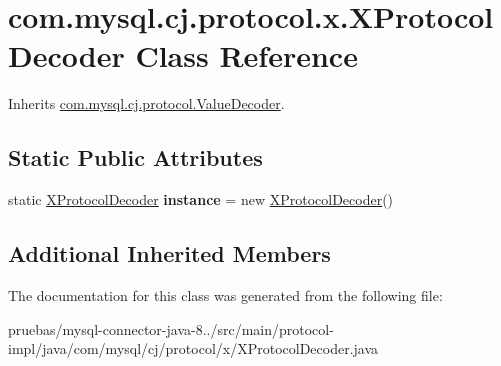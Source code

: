 \hypertarget{classcom_1_1mysql_1_1cj_1_1protocol_1_1x_1_1_x_protocol_decoder}{}\section{com.\+mysql.\+cj.\+protocol.\+x.\+X\+Protocol\+Decoder Class Reference}
\label{classcom_1_1mysql_1_1cj_1_1protocol_1_1x_1_1_x_protocol_decoder}


Inherits \mbox{\hyperlink{interfacecom_1_1mysql_1_1cj_1_1protocol_1_1_value_decoder}{com.\+mysql.\+cj.\+protocol.\+Value\+Decoder}}.

\subsection*{Static Public Attributes}
\begin{DoxyCompactItemize}
\item 
\mbox{\label{classcom_1_1mysql_1_1cj_1_1protocol_1_1x_1_1_x_protocol_decoder_a33586fad8de270f9c09836b1ebff14bb}} 
static \mbox{\hyperlink{classcom_1_1mysql_1_1cj_1_1protocol_1_1x_1_1_x_protocol_decoder}{X\+Protocol\+Decoder}} {\bfseries instance} = new \mbox{\hyperlink{classcom_1_1mysql_1_1cj_1_1protocol_1_1x_1_1_x_protocol_decoder}{X\+Protocol\+Decoder}}()
\end{DoxyCompactItemize}
\subsection*{Additional Inherited Members}


The documentation for this class was generated from the following file\+:\begin{DoxyCompactItemize}
\item 
pruebas/mysql-\/connector-\/java-\/8../src/main/protocol-\/impl/java/com/mysql/cj/protocol/x/X\+Protocol\+Decoder.\+java\end{DoxyCompactItemize}
